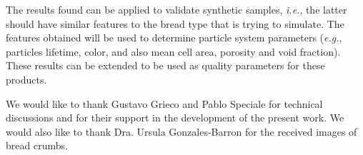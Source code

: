 The results found can be applied to validate synthetic samples, {\em i.e.}, the latter should have similar features to the bread type that is trying to simulate. The features obtained will be used to determine particle system parameters ({\em e.g.}, particles lifetime, color, and also mean cell area, porosity and void fraction). These results can be extended to be used as quality parameters for these products.

\begin{acknowledgements}
We would like to thank Gustavo Grieco and Pablo Speciale for technical discussions and for their support in the development of the present work. We would also like to thank Dra. Ursula Gonzales-Barron for the received images of bread crumbs.
\end{acknowledgements}


%
%



